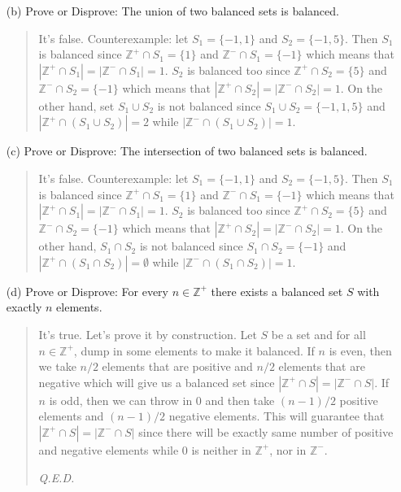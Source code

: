 \documentclass[12pt, a4paper]{article}                      %
\begin{document}
\begin{itemize}
\begin{itemize}
\item[]

\item[(b)]
Prove or Disprove: The union of two balanced sets is balanced.
\begin{quote}
It's false. Counterexample: let $S_1 = \{-1, 1\}$ and $S_2 = \{-1, 5\}$.
Then $S_1$ is balanced since $\mathbb{Z}^+ \cap S_1 = \{1\}$ and $\mathbb{Z}^- \cap S_1 = \{-1\}$ which
means that $|\mathbb{Z}^+ \cap S_1| = |\mathbb{Z}^- \cap S_1| = 1$. $S_2$ is balanced too since
$\mathbb{Z}^+ \cap S_2 = \{5\}$ and $\mathbb{Z}^- \cap S_2 = \{-1\}$ which means that
$|\mathbb{Z}^+ \cap S_2| = |\mathbb{Z}^- \cap S_2| = 1$. On the other hand, set $S_1 \cup S_2$ is not balanced
since $S_1 \cup S_2 = \{-1, 1, 5\}$ and $|\mathbb{Z}^+ \cap (S_1 \cup S_2)| = 2$ while $|\mathbb{Z}^- \cap (S_1 \cup S_2)| = 1$.
\end{quote}

\item[]

\item[(c)]
Prove or Disprove: The intersection of two balanced sets is balanced. 
\begin{quote}
It's false. Counterexample: let $S_1 = \{-1, 1\}$ and $S_2 = \{-1, 5\}$.
Then $S_1$ is balanced since $\mathbb{Z}^+ \cap S_1 = \{1\}$ and $\mathbb{Z}^- \cap S_1 = \{-1\}$ which
means that $|\mathbb{Z}^+ \cap S_1| = |\mathbb{Z}^- \cap S_1| = 1$. $S_2$ is balanced too since
$\mathbb{Z}^+ \cap S_2 = \{5\}$ and $\mathbb{Z}^- \cap S_2 = \{-1\}$ which means that
$|\mathbb{Z}^+ \cap S_2| = |\mathbb{Z}^- \cap S_2| = 1$. On the other hand, $S_1 \cap S_2$ is not balanced
since $S_1 \cap S_2 = \{-1\}$ and $|\mathbb{Z}^+ \cap (S_1 \cap S_2)| = \emptyset$ while $|\mathbb{Z}^- \cap (S_1 \cap S_2)| = 1$.
\end{quote}

\item[]

\item[(d)]
Prove or Disprove: For every $n \in \mathbb{Z}^+$ there exists a balanced set $S$ with exactly $n$ elements.
\begin{quote}
It's true. Let's prove it by construction. Let $S$ be a set and for all $n \in \mathbb{Z}^+$, dump in some elements to make it balanced.
If $n$ is even, then we take $n/2$ elements that are positive
and $n/2$ elements that are negative which will give us a balanced set since $|\mathbb{Z}^+ \cap S| = |\mathbb{Z}^- \cap S|$.
If $n$ is odd, then we can throw in $0$ and then take $(n - 1)/2$ positive elements and $(n - 1)/2$ negative elements.
This will guarantee that $|\mathbb{Z}^+ \cap S| = |\mathbb{Z}^- \cap S|$ since there will be exactly same number of positive and negative
elements while 0 is neither in $\mathbb{Z}^+$, nor in $\mathbb{Z}^-$.
\begin{flushright}
\textit{Q.E.D.}
\end{flushright}
\end{quote}


\end{itemize}
\end{itemize}
\end{document}
